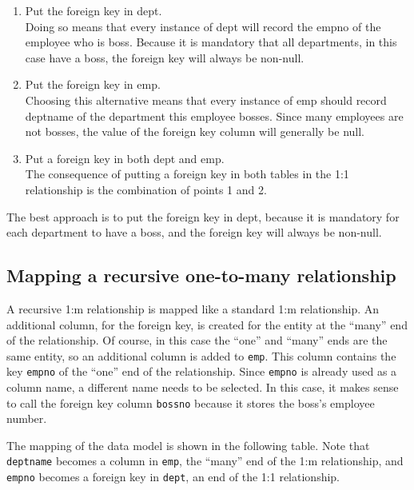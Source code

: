 \documentclass[
]{article}
\begin{document}
\begin{enumerate}
\def\labelenumi{\arabic{enumi}.}
\item
  Put the foreign key in dept.\\
  Doing so means that every instance of dept will record the empno of
  the employee who is boss. Because it is mandatory that all
  departments, in this case have a boss, the foreign key will always
  be non-null.
\item
  Put the foreign key in emp.\\
  Choosing this alternative means that every instance of emp should
  record deptname of the department this employee bosses. Since many
  employees are not bosses, the value of the foreign key column will
  generally be null.
\item
  Put a foreign key in both dept and emp.\\
  The consequence of putting a foreign key in both tables in the 1:1
  relationship is the combination of points 1 and 2.
\end{enumerate}

The best approach is to put the foreign key in dept, because it is
mandatory for each department to have a boss, and the foreign key will
always be non-null.

\hypertarget{mapping-a-recursive-one-to-many-relationship}{%
\subsection*{Mapping a recursive one-to-many relationship}\label{mapping-a-recursive-one-to-many-relationship}}

A recursive 1:m relationship is mapped like a standard 1:m relationship.
An additional column, for the foreign key, is created for the entity at
the ``many'' end of the relationship. Of course, in this case the ``one''
and ``many'' ends are the same entity, so an additional column is added to
\texttt{emp}. This column contains the key \texttt{empno} of the ``one'' end of the
relationship. Since \texttt{empno} is already used as a column name, a
different name needs to be selected. In this case, it makes sense to
call the foreign key column \texttt{bossno} because it stores the boss's
employee number.

The mapping of the data model is shown in the following table. Note that
\texttt{deptname} becomes a column in \texttt{emp}, the ``many'' end of the 1:m
relationship, and \texttt{empno} becomes a foreign key in \texttt{dept}, an end of the
1:1 relationship.
\end{document}
